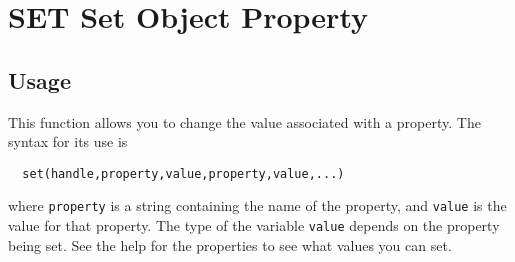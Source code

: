 \section{SET Set Object Property}

\subsection{Usage}

This function allows you to change the value associated
with a property.  The syntax for its use is
\begin{verbatim}
  set(handle,property,value,property,value,...)
\end{verbatim}
where \verb|property| is a string containing the name of the
property, and \verb|value| is the value for that property. The
type of the variable \verb|value| depends on the property being
set.  See the help for the properties to see what values
you can set.
